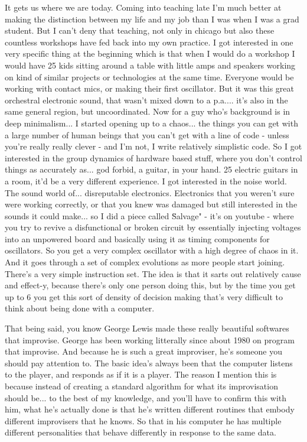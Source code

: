 It gets us where we are today. Coming into teaching late I'm much better at making the distinction between my life and my job than I was when I was a grad student. But I can't deny that teaching, not only in chicago but also these countless workshops have fed back into my own practice. I got interested in one very specific thing at the beginning which is that when I would do a workshop I would have 25 kids sitting around a table with little amps and speakers working on kind of similar projects or technologies at the same time. Everyone would be working with contact mics, or making their first oscillator. But it was this great orchestral electronic sound, that wasn't mixed down to a p.a.... it's also in the same general region, but uncoordinated. Now for a guy who's background is in deep minimalism... I started opening up to a chaos... the things you can get with a large number of human beings that you can't get with a line of code - unless you're really really clever - and I'm not, I write relatively simplistic code. So I got interested in the group dynamics of hardware based stuff, where you don't control things as accurately as... god forbid, a guitar, in your hand. 25 electric guitars in a room, it'd be a very different experience. I got interested in the noise world. The sound world of... disreputable electronics. Electronics that you weren't sure were working correctly, or that you knew was damaged but still interested in the sounds it could make... so I did a piece called \"Salvage" - it's on youtube - where you try to revive a disfunctional or broken circuit by essentially injecting voltages into an unpowered board and basically using it as timing components for oscillators. So you get a very complex oscillator with a high degree of chaos in it. And it goes through a set of complex evolutions as more people start joining. There's a very simple instruction set. The idea is that it sarts out relatively cause and effect-y, because there's only one person doing this, but by the time you get up to 6 you get this sort of density of decision making that's very difficult to think about being done with a computer. 

That being said, you know George Lewis made these really beautiful softwares that improvise. George has been working litterally since about 1980 on program that improvise. And because he is such a great improviser, he's someone you should pay attention to. The basic idea's always been that the computer listens to the player, and responds as if it is a player. The reason I mention this is because instead of creating a standard algorithm for what its improvisation should be... to the best of my knowledge, and you'll have to confirm this with him, what he's actually done is that he's written different routines that embody different improvisers that he knows. So that in his computer he has multiple different personalities that behave differently in response to the same data. 

